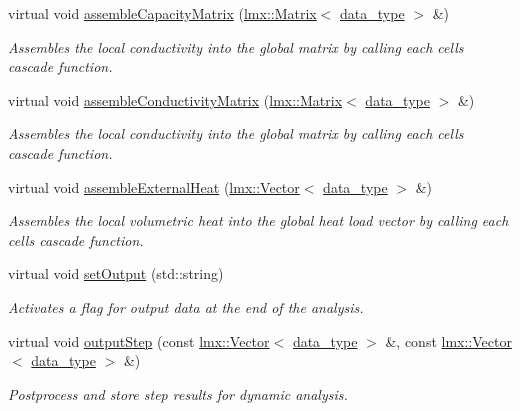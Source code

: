 \begin{DoxyCompactItemize}
virtual void \hyperlink{classmknix_1_1_thermal_body_a924ad06260f3ab9c181fd6149425bc6f}{assemble\+Capacity\+Matrix} (\hyperlink{classlmx_1_1_matrix}{lmx\+::\+Matrix}$<$ \hyperlink{namespacemknix_a16be4b246fbf2cceb141e3a179111020}{data\+\_\+type} $>$ \&)
\begin{DoxyCompactList}\small\item\em Assembles the local conductivity into the global matrix by calling each cell\textquotesingle{}s cascade function. \end{DoxyCompactList}\item 
virtual void \hyperlink{classmknix_1_1_thermal_body_a205d5c7c2c3b96577bb8d539ba3931f6}{assemble\+Conductivity\+Matrix} (\hyperlink{classlmx_1_1_matrix}{lmx\+::\+Matrix}$<$ \hyperlink{namespacemknix_a16be4b246fbf2cceb141e3a179111020}{data\+\_\+type} $>$ \&)
\begin{DoxyCompactList}\small\item\em Assembles the local conductivity into the global matrix by calling each cell\textquotesingle{}s cascade function. \end{DoxyCompactList}\item 
virtual void \hyperlink{classmknix_1_1_thermal_body_a32328eca2fc0240ae2735bf402b3bdb8}{assemble\+External\+Heat} (\hyperlink{classlmx_1_1_vector}{lmx\+::\+Vector}$<$ \hyperlink{namespacemknix_a16be4b246fbf2cceb141e3a179111020}{data\+\_\+type} $>$ \&)
\begin{DoxyCompactList}\small\item\em Assembles the local volumetric heat into the global heat load vector by calling each cell\textquotesingle{}s cascade function. \end{DoxyCompactList}\item 
virtual void \hyperlink{classmknix_1_1_thermal_body_a1b40d106be9463126117d455fb508f86}{set\+Output} (std\+::string)
\begin{DoxyCompactList}\small\item\em Activates a flag for output data at the end of the analysis. \end{DoxyCompactList}\item 
virtual void \hyperlink{classmknix_1_1_thermal_body_afb78089ba843d2496cce134429cbd659}{output\+Step} (const \hyperlink{classlmx_1_1_vector}{lmx\+::\+Vector}$<$ \hyperlink{namespacemknix_a16be4b246fbf2cceb141e3a179111020}{data\+\_\+type} $>$ \&, const \hyperlink{classlmx_1_1_vector}{lmx\+::\+Vector}$<$ \hyperlink{namespacemknix_a16be4b246fbf2cceb141e3a179111020}{data\+\_\+type} $>$ \&)
\begin{DoxyCompactList}\small\item\em Postprocess and store step results for dynamic analysis. \end{DoxyCompactList}\item 

\end{DoxyCompactItemize}
